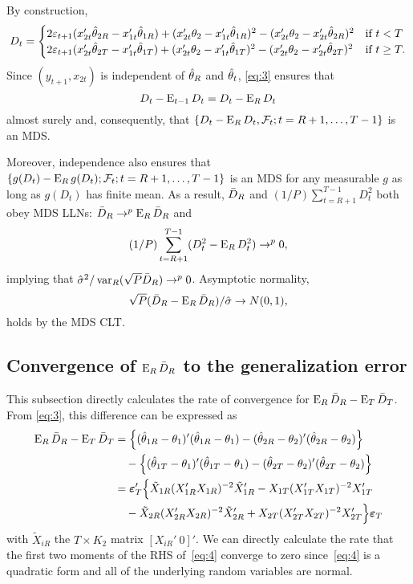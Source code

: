 By construction,
\begin{equation}\label{eq:3}
  D_t =
  \begin{cases}
    2 \varepsilon_{t+1} (x_{2t}'\hat\theta_{2R} - x_{1t}'\hat\theta_{1R})
    + (x_{2t}'\theta_2 - x_{1t}'\hat\theta_{1R})^2
    - (x_{2t}'\theta_2 - x_{2t}'\hat\theta_{2R})^2
    & \text{if\ } t < T \\
    2 \varepsilon_{t+1} (x_{2t}'\hat\theta_{2T} - x_{1t}'\hat\theta_{1T})
    + (x_{2t}'\theta_2 - x_{1t}'\hat\theta_{1T})^2
    - (x_{2t}'\theta_2 - x_{2t}'\hat\theta_{2T})^2
    & \text{if\ } t \geq T.
  \end{cases}
\end{equation}
Since $(y_{t+1}, x_{2t})$ is independent of $\hat\theta_{R}$ and $\hat\theta_{t}$,
\eqref{eq:3} ensures that
\begin{equation*}
  D_t - \operatorname{E}_{t-1} D_t = D_t - \operatorname{E}_R D_t
\end{equation*}
almost surely and, consequently, that
$\{D_t - \operatorname{E}_R D_t, \mathcal{F}_{t}; t=R+1,\dots,T-1\}$ is an MDS.

Moreover, independence also ensures that
$\{g(D_t) - \operatorname{E}_R g(D_t); \mathcal{F}_t; t = R+1,\dots,T-1\}$
is an MDS for any measurable $g$ as long as
$g(D_t)$ has finite mean.
As a result, $\bar{D}_{R}$ and $(1/P) \sum_{t=R+1}^{T-1} D_t^2$ both obey
MDS LLNs: $\bar{D}_{R} \to^p \operatorname{E}_R \bar{D}_{R}$ and
\begin{equation*}
  (1/P) \sum_{t=R+1}^{T-1} (D_t^2 - \operatorname{E}_R D_t^2) \to^p 0,
\end{equation*}
implying that $\hat{\sigma}^2/\operatorname{var}_R(\sqrt{P} \bar{D}_{R}) \to^p 0$.
Asymptotic normality,
\begin{equation*}
  \sqrt{P} (\bar{D}_{R} - \operatorname{E}_R \bar{D}_{R} )/\hat{\sigma} \to N(0,1),
\end{equation*}
holds by the MDS CLT.

\subsection{Convergence of $\operatorname{E}_R \bar{D}_{R}$ to the generalization error}

This subsection directly calculates the rate of convergence for
$\operatorname{E}_R \bar{D}_{R} - \operatorname{E}_T \bar{D}_{T}$. From \eqref{eq:3}, this difference can
be expressed as
\begin{align}
    \operatorname{E}_R \bar{D}_{R} - \operatorname{E}_T \bar{D}_{T} &= \Big\{(\hat\theta_{1R} - \theta_1)'(\hat\theta_{1R} - \theta_1) -
    (\hat\theta_{2R} - \theta_2)'(\hat\theta_{2R} - \theta_2)\Big\} \notag \\
    & \quad - \Big\{(\hat\theta_{1T} - \theta_1)'(\hat\theta_{1T} - \theta_1) -
    (\hat\theta_{2T} - \theta_2)'(\hat\theta_{2T} - \theta_2)\Big\} \\
    &=\boldsymbol{\varepsilon}_{T}'\Big\{
      \tilde{X}_{1R}(X_{1R}'X_{1R})^{-2} \tilde{X}_{1R}'
      - X_{1T}(X_{1T}'X_{1T})^{-2} X_{1T}' \notag \\
      & \quad  - \tilde{X}_{2R}(X_{2R}'X_{2R})^{-2} \tilde{X}_{2R}'
      + X_{2T}(X_{2T}'X_{2T})^{-2} X_{2T}'
      \Big\}\boldsymbol{\varepsilon}_{T} \label{eq:4}
\end{align}
with $\tilde{X}_{iR}$ the $T \times K_2$ matrix $[X_{iR}'\ 0]'$.  We
can directly calculate the rate that the first two moments of the RHS
of~\eqref{eq:4} converge to zero since~\eqref{eq:4} is a quadratic
form and all of the underlying random variables are normal.

